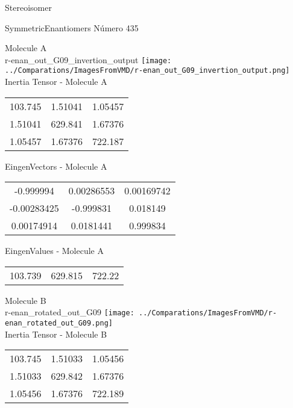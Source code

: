 \begin{center}
\vtab
\vtab
\textcolor{NavyBlue}{\Large Stereoisomer}
\end{center}

 \newpage

\vtab[-2cm]
\begin{center}
{\large SymmetricEnantiomers \tab Número 435}
\end{center}
\begin{multicols}{2}
\begin{center}

Molecule A \\ 
r-enan\_out\_G09\_invertion\_output
\texttt{[image: ../Comparations/ImagesFromVMD/r-enan\_out\_G09\_invertion\_output.png]}
\\
Inertia Tensor - Molecule A \\
\vtab

\begin{tabular}{|c c c|}
103.745	 & 	1.51041	 & 	1.05457	 \\
1.51041	 & 	629.841	 & 	1.67376	 \\
1.05457	 & 	1.67376	 & 	722.187
\end{tabular}

\vtab
 EingenVectors - Molecule A     \\
\vtab
\begin{tabular}{|c c c|}
-0.999994	 & 	0.00286553	 & 	0.00169742	 \\
-0.00283425	 & 	-0.999831	 & 	0.018149	 \\
0.00174914	 & 	0.0181441	 & 	0.999834
\end{tabular}

\vtab
 EingenValues - Molecule A     \\
\vtab
\begin{tabular}{|c c c|}
103.739	 & 	629.815	 & 	722.22	 \\
\end{tabular}
\columnbreak

Molecule B \\ 
r-enan\_rotated\_out\_G09
\texttt{[image: ../Comparations/ImagesFromVMD/r-enan\_rotated\_out\_G09.png]}
\\
Inertia Tensor - Molecule B \\
\vtab

\begin{tabular}{|c c c|}
103.745	 & 	1.51033	 & 	1.05456	 \\
1.51033	 & 	629.842	 & 	1.67376	 \\
1.05456	 & 	1.67376	 & 	722.189
\end{tabular}


\end{center}
\end{multicols}
